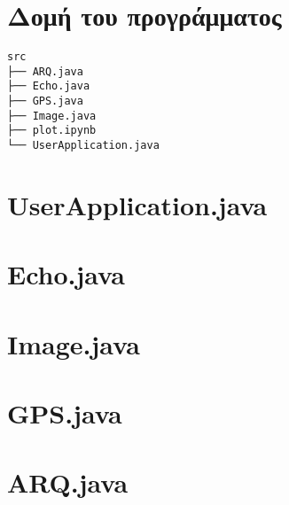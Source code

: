 \documentclass[hidelinks, 12pt, a4paper]{article}
\begin{document}
\sloppy %




\pagebreak
{
\renewcommand*\contentsname{Περιεχόμενα}
\hypersetup{linkcolor=black}
\tableofcontents
}
\pagebreak

\section{Δομή του προγράμματος}

\vspace{1cm}

\begin{verbatim}
src
├── ARQ.java
├── Echo.java
├── GPS.java
├── Image.java
├── plot.ipynb
└── UserApplication.java
\end{verbatim}

\section{UserApplication.java}



\pagebreak

\section{Echo.java}



\section{Image.java}



\section{GPS.java}



\section{ARQ.java}





\end{document}
